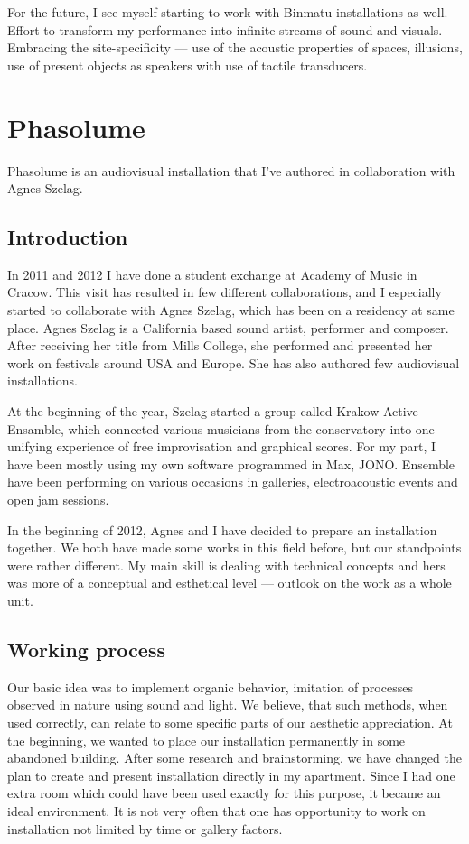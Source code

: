 \documentclass[12pt,a4paper,oneside]{report}
\begin{document}
For the future, I see myself starting to work with Binmatu installations as well. Effort to transform my performance into infinite streams of sound and visuals. Embracing the site-specificity --- use of the acoustic properties of spaces, illusions, use of present objects as speakers with use of tactile transducers.


\clearpage
\section{Phasolume} Phasolume is an audiovisual installation that I've authored in collaboration with Agnes Szelag.

\subsection{Introduction} In 2011 and 2012 I have done a student exchange at Academy of Music in Cracow. This visit has resulted in few different collaborations, and I especially started to collaborate with Agnes Szelag, which has been on a residency at same place. Agnes Szelag is a California based sound artist, performer and composer. After receiving her title from Mills College, she performed and presented her work on festivals around USA and Europe. She has also authored few audiovisual installations. 

At the beginning of the year, Szelag started a group called Krakow Active Ensamble, which connected various musicians from the conservatory into one unifying experience of free improvisation and graphical scores. For my part, I have been mostly using my own software programmed in Max, JONO. Ensemble have been performing on various occasions in galleries, electroacoustic events and open jam sessions.

In the beginning of 2012, Agnes and I have decided to prepare an installation together. We both have made some works in this field before, but our standpoints were rather different. My main skill is dealing with technical concepts and hers was more of a conceptual and esthetical level --- outlook on the work as a whole unit. 

\subsection{Working process} Our basic idea was to implement organic behavior, imitation of processes observed in nature using sound and light. We believe, that such methods, when used correctly, can relate to some specific parts of our aesthetic appreciation. At the beginning, we wanted to place our installation permanently in some abandoned building. After some research and brainstorming, we have changed the plan to create and present installation directly in my apartment. Since I had one extra room which could have been used exactly for this purpose, it became an ideal environment. It is not very often that one has opportunity to work on installation not limited by time or gallery factors.
\end{document}
